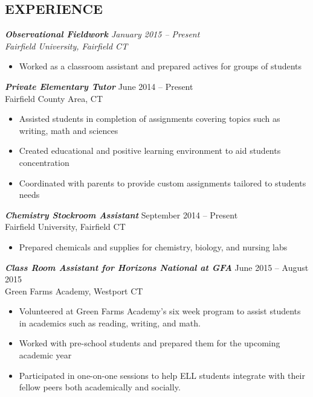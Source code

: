 \documentclass[margin, 10pt]{res}
\begin{document}
\begin{resume}
\section{EXPERIENCE}
{\sl\textbf{Observational Fieldwork} \hfill January 2015 -- Present \\
{\small{Fairfield University, Fairfield CT}}
\begin{itemize} \itemsep -1.5pt %
  \item Worked as a classroom assistant and prepared actives for groups of students
\end{itemize}
%
{\sl \textbf{Private Elementary Tutor}} \hfill June 2014 -- Present\\
{\small{Fairfield County Area, CT}}
\begin{itemize} \itemsep -1.5pt %
  \item Assisted students in completion of assignments covering topics such as writing, math and sciences
  \item Created educational and positive learning environment to aid students concentration
  \item Coordinated with parents to provide custom assignments tailored to students needs
\end{itemize}
%
{\sl \textbf{Chemistry Stockroom Assistant}} \hfill September 2014 -- Present \\
{\small{Fairfield University, Fairfield CT}}
\begin{itemize} \itemsep -1.5pt %
  \item Prepared chemicals and supplies for chemistry, biology, and nursing labs
\end{itemize}
%
{\sl \textbf{Class Room Assistant for Horizons National at GFA}} \hfill June 2015 -- August 2015 \\
{\small{Green Farms Academy, Westport CT}}
\begin{itemize} \itemsep -1.5pt %
  \item Volunteered at Green Farms Academy's six week program to assist students in academics such as reading, writing, and math.
  \item Worked with pre-school students and prepared them for the upcoming academic year
  \item Participated in one-on-one sessions to help ELL students integrate with their fellow peers both academically and socially. 
\end{itemize}
%
}
\end{resume}
\end{document}
